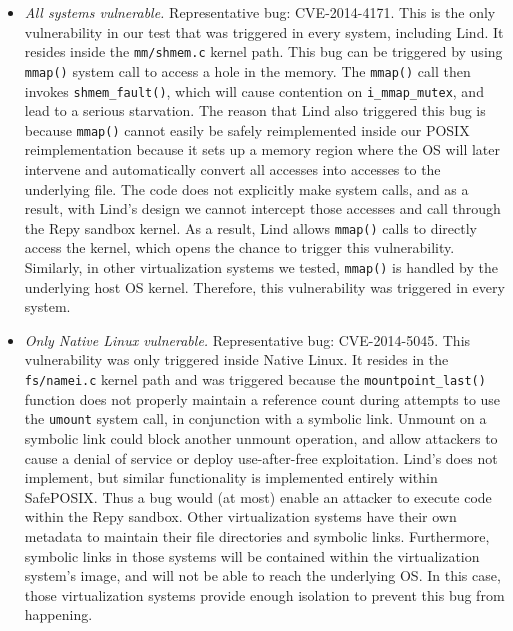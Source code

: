 {\begin{itemize}
\item \emph{All systems vulnerable.}  Representative bug: CVE-2014-4171.
This is the only vulnerability in our test that was triggered in every
system, including Lind. It resides inside the \texttt{mm/shmem.c} kernel path. This bug can
be triggered by using \texttt{mmap()} system call to access a hole in the memory.
The \texttt{mmap()} call then invokes \texttt{shmem\_fault()}, which will cause contention
on \texttt{i\_mmap\_mutex}, and lead to a serious starvation.
The reason that Lind also triggered this bug is because \texttt{mmap()} cannot easily
be safely reimplemented inside our POSIX reimplementation because it sets up a
memory region where the OS will later
intervene and automatically convert all accesses into accesses to the
underlying file.  The code does not explicitly make system calls, and as
a result, with Lind's design we cannot intercept those accesses and call through
the Repy sandbox kernel. As a result,
Lind allows \texttt{mmap()} calls to directly access the kernel, which
opens the chance to trigger this vulnerability. Similarly, in other
virtualization systems we tested, \texttt{mmap()} is handled by the underlying
host OS kernel.  
Therefore, this vulnerability was
triggered in every system.

\item \emph{Only Native Linux vulnerable.}  Representative bug: CVE-2014-5045.
This vulnerability was only triggered inside Native Linux. It resides in the
\texttt{fs/namei.c} kernel path and was triggered because
the \texttt{mountpoint\_last()}
function does not properly
maintain a reference count during attempts to use the \texttt{umount} system call,
in conjunction with a symbolic link. Unmount  on a symbolic link could block another unmount operation,
and allow attackers to cause a denial of service or deploy use-after-free exploitation.
Lind's  does not implement, but similar functionality is implemented entirely
within SafePOSIX.  Thus a bug would (at most) enable an attacker to execute
code within the Repy sandbox.
Other virtualization systems have their own metadata to maintain their file directories and symbolic links. 
Furthermore, symbolic links in those systems will be contained within the virtualization system's image,
and will not be able to reach the underlying OS. In this case, those virtualization systems provide enough
isolation to prevent this bug from happening.


\end{itemize}}
